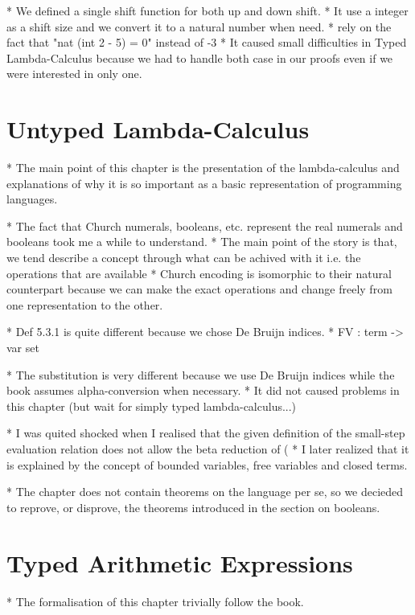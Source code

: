 \documentclass[a4paper, oneside, 12pt, titlepage]{article}
\begin{document}
  * We defined a single shift function for both up and down shift.
    * It use a integer as a shift size and we convert it to a natural number when need.
      * rely on the fact that "nat (int 2 - 5) = 0" instead of -3
    * It caused small difficulties in Typed Lambda-Calculus because we had to handle both case in
      our proofs even if we were interested in only one.

\section{Untyped Lambda-Calculus}
\label{sec:untyped-lambda-calculus}

  * The main point of this chapter is the presentation of the lambda-calculus and explanations of
    why it is so important as a basic representation of programming languages.

  * The fact that Church numerals, booleans, etc. represent the real numerals and booleans took me a
    while to understand.
    * The main point of the story is that, we tend describe a concept through what can be achived
      with it i.e. the operations that are available
    * Church encoding is isomorphic to their natural counterpart because we can make the exact
      operations and change freely from one representation to the other.

  * Def 5.3.1 is quite different because we chose De Bruijn indices.
    * FV : term -> var set

  * The substitution is very different because we use De Bruijn indices while the book assumes
    alpha-conversion when necessary.
    * It did not caused problems in this chapter (but wait for simply typed lambda-calculus...)

  * I was quited shocked when I realised that the given definition of the small-step evaluation
    relation does not allow the beta reduction of (%
    * I later realized that it is explained by the concept of bounded variables, free variables and
      closed terms.

  * The chapter does not contain theorems on the language per se, so we decieded to reprove, or
    disprove, the theorems introduced in the section on booleans.

\section{Typed Arithmetic Expressions}
\label{sec:typed-arith-expr}

  * The formalisation of this chapter trivially follow the book.
\end{document}
